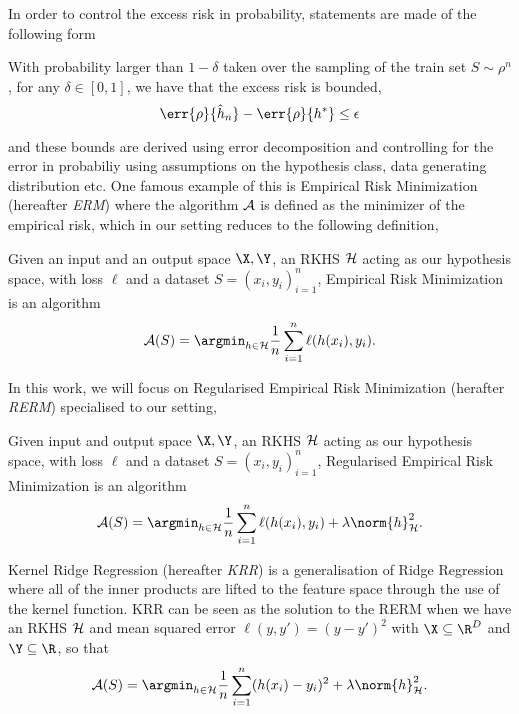 In order to control the excess risk in probability, statements are made of the
following form
\begin{example}
  \label{ex:pac-like-excess-risk} With probability larger than \(1 - \delta\)
taken over the sampling of the train set \(S \sim \rho^n\), for any \(\delta \in
[0, 1]\), we have that the excess risk is bounded,
  \begin{equation*} \err{\rho}{\hat{h}_n} - \err{\rho}{h^{\ast}} \leq \epsilon
  \end{equation*}
\end{example} and these bounds are derived using error decomposition and
controlling for the error in probabiliy using assumptions on the hypothesis
class, data generating distribution etc. One famous example of this is Empirical
Risk Minimization (hereafter \emph{ERM})\cite{vapnik92_princ} where the
algorithm \(\mathcal{A}\) is defined as the minimizer of the empirical risk, which in
our setting reduces to the following definition,
\begin{definition}
  \label{def:erm} Given an input and an output space \(\X, \Y\), an RKHS
\(\mathcal{H}\) acting as our hypothesis space, with loss \(\ell\) and a dataset
\(S = (x_i, y_i)_{i=1}^n\), Empirical Risk Minimization is an algorithm
  \begin{equation} \algo(S) = \argmin_{h \in \mathcal{H}} \frac{1}{n}
\sum_{i=1}^n \ell(h(x_i), y_i).
  \end{equation}
\end{definition} In this work, we will focus on Regularised Empirical Risk
Minimization (herafter \emph{RERM}) specialised to our setting,
\begin{definition}
  \label{def:rerm} Given input and output space \(\X, \Y\), an RKHS \(\mathcal{H}\)
acting as our hypothesis space, with loss \(\ell\) and a dataset \(S = (x_i,
y_i)_{i=1}^n\), Regularised Empirical Risk Minimization is an algorithm
  \begin{equation} \algo(S) = \argmin_{h \in \mathcal{H}} \frac{1}{n}
\sum_{i=1}^n \ell(h(x_i), y_i) + \lambda \norm{h}_{\rkhs{H}}^2.
  \end{equation}
\end{definition}

Kernel Ridge Regression (hereafter \emph{KRR}) is a generalisation of Ridge
Regression \cite{hoerl70_ridge_regres} where all of the inner products are
lifted to the feature space through the use of the kernel function. KRR can be
seen as the solution to the RERM when we have an RKHS \(\mathcal{H}\) and mean
squared error \(\ell(y, y') = (y - y')^{2}\) with \(\X \subseteq \R^{D}\) and
\(\Y \subseteq \R\), so that
\begin{equation}
  \label{eq:krr-rerm-form} \algo(S) = \argmin_{h \in \mathcal{H}}
\frac{1}{n}\sum_{i=1}^n (h(x_i) - y_i)^2 + \lambda \norm{h}_{\rkhs{H}}^2.
\end{equation}

